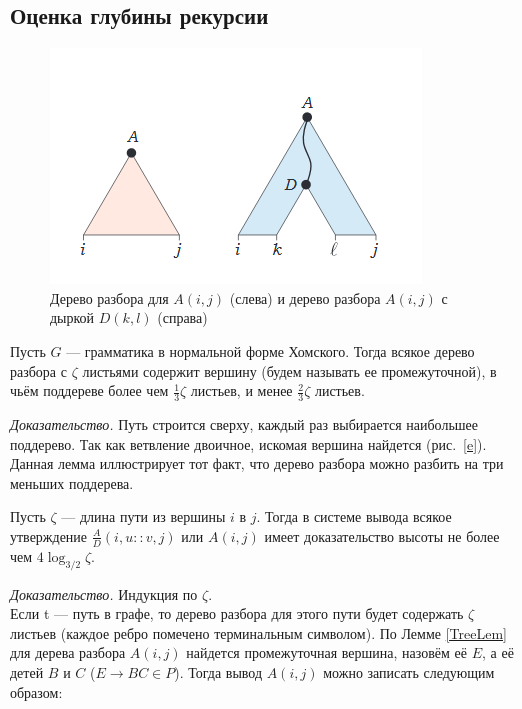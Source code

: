 \documentclass{spbau-diploma}
\begin{document}
\subsection {Оценка глубины рекурсии} 
\begin{figure}[!]
\centering
\includegraphics[scale=0.94]{trees.png}
\caption{Дерево разбора для $A(i, j)$ (слева) и дерево разбора $A(i, j)$ с дыркой $D(k, l)$ (справа)}
\label{hole}
\end{figure}
\begin{lemmarus}\label{TreeLem}
Пусть $G$ --- грамматика в нормальной форме Хомского. Тогда всякое дерево разбора с $\zeta$ листьями содержит вершину (будем называть ее  промежуточной), в чьём поддереве более чем $\frac{1}{3}\zeta$ листьев, и менее $\frac{2}{3}\zeta$ листьев. 
\end{lemmarus}
\textit{Доказательство.}  Путь строится сверху, каждый раз выбирается наибольшее поддерево. Так как ветвление двоичное, искомая вершина найдется (рис.~\ref{e}). Данная лемма иллюстрирует тот факт, что дерево разбора можно разбить на три меньших поддерева.


\begin{lemmarus}\label{Depthlem}
Пусть $\zeta$ --- длина пути из вершины $i$ в $j$. Тогда в системе вывода всякое утверждение  $\frac{A}{D}(i , u :: v , j)$ или $A(i , j)$ имеет доказательство высоты не более чем $4\log_{3/2}\zeta$.
\end{lemmarus}
\textit{Доказательство.}  Индукция по $\zeta$.
\\Если t --- путь в графе, то дерево разбора для этого пути будет содержать $\zeta$ листьев (каждое ребро помечено терминальным символом). По Лемме \ref{TreeLem} для дерева разбора  $A(i, j)$ найдется промежуточная вершина, назовём её $E$, а её детей $B$ и $C$ ($E \rightarrow BC \in P$). Тогда вывод  $A(i , j)$ можно записать следующим образом:
\begin{prooftree}
\end{prooftree}
\end{document}
